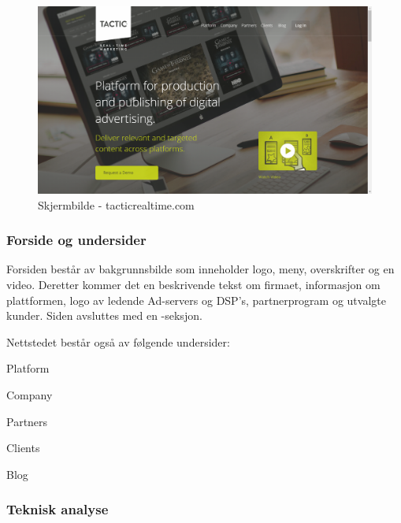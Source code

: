 \begin{figure}[H]
    \centering
    \includegraphics[width=\textwidth]{line/tacticrealtime_com_(1366x768).png}
    \caption{Skjermbilde - tacticrealtime.com}
    \label{fig:competitors-tacticrealtime.com}
\end{figure}

\subsubsection{Forside og undersider}

Forsiden består av bakgrunnsbilde som inneholder logo, meny, overskrifter og en video.  
Deretter kommer det en beskrivende tekst om firmaet, informasjon om plattformen, logo av ledende  Ad-servers og DSP's, partnerprogram og utvalgte kunder. Siden avsluttes med en -seksjon.

Nettstedet består også av følgende undersider:
\begin{compactitem}
\item Platform
\item Company
\item Partners
\item Clients
\item Blog
\end{compactitem}

\subsubsection{Teknisk analyse}

